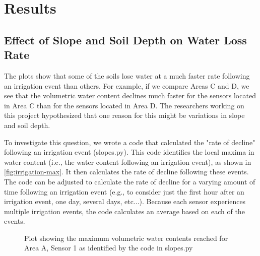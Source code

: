 \documentclass[12pt]{scrartcl}
\begin{document}
\section{Results}
\subsection{Effect of Slope and Soil Depth on Water Loss Rate}
The plots show that some of the soils lose water at a much faster rate following an irrigation event than others. For example, if we compare Areas C and D, we see that the volumetric water content declines much faster for the sensors located in Area C than for the sensors located in Area D. The researchers working on this project hypothesized that one reason for this might be variations in slope and soil depth.

To investigate this question, we wrote a code that calculated the "rate of decline" following an irrigation event (slopes.py). This code identifies the local maxima in water content (i.e., the water content following an irrigation event), as shown in \autoref{fig:irrigation-max}. It then calculates the rate of decline following these events. The code can be adjusted to calculate the rate of decline for a varying amount of time following an irrigation event (e.g., to consider just the first hour after an irrigation event, one day, several days, etc...). Because each sensor experiences multiple irrigation events, the code calculates an average based on each of the events.

\begin{figure}[!htb]
        \caption{\label{fig:irrigation-max} Plot showing the maximum volumetric water contents reached for Area A, Sensor 1 as identified by the code in slopes.py}
\end{figure}
\end{document}
